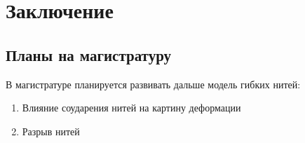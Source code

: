 \chapter{Заключение}\label{ch:conclusion}


\section*{Планы на магистратуру}
В магистратуре планируется развивать дальше модель гибких нитей:

\begin{enumerate}
    \item Влияние соударения нитей на картину деформации
    \item Разрыв нитей
\end{enumerate}